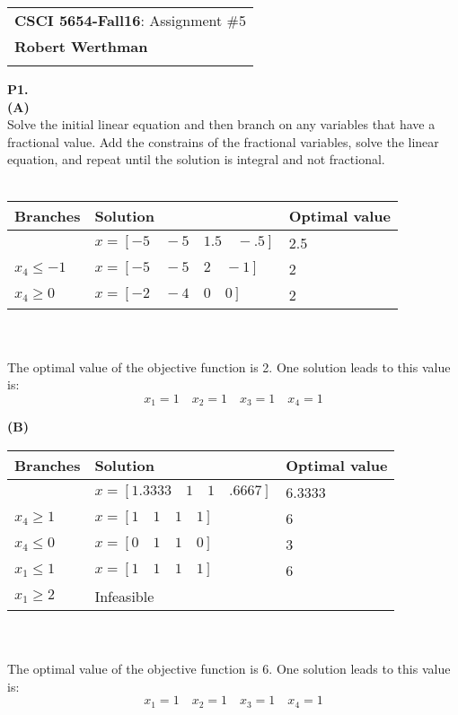 \documentclass[11pt]{article}
\begin{document}
\begin{tabular}{l}
	\textbf{CSCI 5654-Fall16}: Assignment \#5 \\
	\textbf{Robert Werthman} \phantom{Supercalifragilisticexpialidocius Smith} \\
	\hline \\[10pt]
\end{tabular}

\noindent\textbf{P1.}
\\
\noindent\textbf{(A)}
\\
Solve the initial linear equation and then branch on any variables that have a fractional value.  Add the constrains of the fractional variables, solve the linear equation, and repeat until the solution is integral and not fractional.\\ \\
\begin{tabular}{|l|l|l|}
\hline
Branches & Solution & Optimal value \\ \hline
& $x = [-5\quad-5\quad1.5\quad-.5]$ & 2.5 \\ \hline
$x_4 \leq -1$ & $x = [-5\quad-5\quad2\quad-1]$ & 2\\ \hline
$x_4 \geq 0$ & $x = [-2\quad-4\quad0\quad0]$ & 2 \\ \hline
\end{tabular}
\\ \\
The optimal value of the objective function is 2.  One solution leads to this value is: 
$$
x_1 = 1 \quad x_2 = 1 \quad x_3 = 1 \quad x_4 = 1
$$


\noindent\textbf{(B)}
\\
\begin{tabular}{|l|l|l|}
\hline
Branches & Solution & Optimal value \\ \hline
& $x = [1.3333\quad1\quad1\quad.6667]$ & 6.3333 \\ \hline
$x_4 \geq 1$ & $x = [1\quad1\quad1\quad1]$ & 6 \\ \hline
$x_4 \leq 0$ & $x = [0\quad1\quad1\quad0]$ & 3 \\ \hline
$x_1 \leq 1$ & $x = [1\quad1\quad1\quad1]$ & 6 \\ \hline
$x_1 \geq 2$ & Infeasible & \\ \hline
\end{tabular}
\\ \\
The optimal value of the objective function is 6.  One solution leads to this value is:
$$
x_1 = 1 \quad x_2 = 1 \quad x_3 = 1 \quad x_4 = 1
$$
\end{document}
